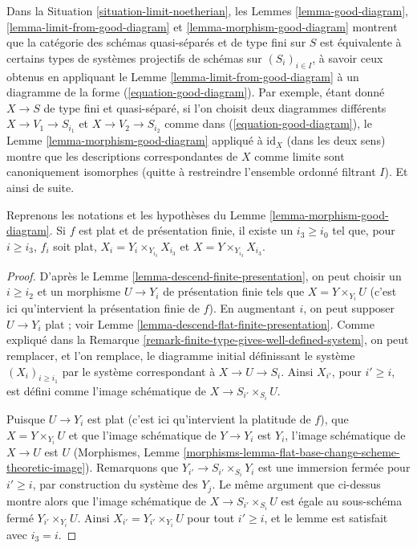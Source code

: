 \begin{remark}
\label{remark-finite-type-gives-well-defined-system}
Dans la Situation \ref{situation-limit-noetherian},
les Lemmes \ref{lemma-good-diagram}, \ref{lemma-limit-from-good-diagram} et
\ref{lemma-morphism-good-diagram}
montrent que la catégorie des schémas quasi-séparés et
de type fini sur $S$ est équivalente à certains types de
systèmes projectifs de schémas sur $(S_i)_{i \in I}$, à savoir
ceux obtenus en appliquant le Lemme \ref{lemma-limit-from-good-diagram}
à un diagramme de la forme (\ref{equation-good-diagram}).
Par exemple, étant donné $X \to S$ de type fini et quasi-séparé,
si l'on choisit deux diagrammes différents $X \to V_1 \to S_{i_1}$
et $X \to V_2 \to S_{i_2}$ comme dans (\ref{equation-good-diagram}),
le Lemme \ref{lemma-morphism-good-diagram} appliqué à $\text{id}_X$
(dans les deux sens)
montre que les descriptions correspondantes de
$X$ comme limite sont canoniquement isomorphes (quitte à restreindre
l'ensemble ordonné filtrant $I$). Et ainsi de suite.
\end{remark}

\begin{lemma}
\label{lemma-morphism-good-diagram-flat}
Reprenons les notations et les hypothèses du Lemme \ref{lemma-morphism-good-diagram}.
Si $f$ est plat et de présentation finie,
il existe un $i_3 \geq i_0$ tel que, pour $i \geq i_3$,
$f_i$ soit plat, $X_i = Y_i \times_{Y_{i_3}} X_{i_3}$ et
$X = Y \times_{Y_{i_3}} X_{i_3}$.
\end{lemma}

\begin{proof}
D'après le Lemme \ref{lemma-descend-finite-presentation},
on peut choisir un $i \geq i_2$ et un morphisme
$U \to Y_i$ de présentation finie tels que $X = Y \times_{Y_i} U$
(c'est ici qu'intervient la présentation finie de $f$).
En augmentant $i$, on peut supposer $U \to Y_i$ plat ; voir
Lemme \ref{lemma-descend-flat-finite-presentation}.
Comme expliqué dans la Remarque \ref{remark-finite-type-gives-well-defined-system},
on peut remplacer, et l'on remplace, le diagramme initial définissant le système
$(X_i)_{i \geq i_1}$ par le système correspondant à
$X \to U \to S_i$. Ainsi $X_{i'}$, pour $i' \geq i$, est défini comme
l'image schématique de $X \to S_{i'} \times_{S_i} U$.

\medskip\noindent
Puisque $U \to Y_i$ est plat (c'est ici qu'intervient la platitude de $f$),
que $X = Y \times_{Y_i} U$ et
que l'image schématique de $Y \to Y_i$ est $Y_i$,
l'image schématique de $X \to U$ est $U$
(Morphismes, Lemme
\ref{morphisms-lemma-flat-base-change-scheme-theoretic-image}).
Remarquons que $Y_{i'} \to S_{i'} \times_{S_i} Y_i$ est une immersion
fermée pour $i' \geq i$, par construction du système des $Y_j$.
Le même argument que ci-dessus montre alors que l'image schématique
de $X \to S_{i'} \times_{S_i} U$
est égale au sous-schéma fermé $Y_{i'} \times_{Y_i} U$.
Ainsi $X_{i'} = Y_{i'} \times_{Y_i} U$ pour tout $i' \geq i$,
et le lemme est satisfait avec $i_3 = i$.
\end{proof}

